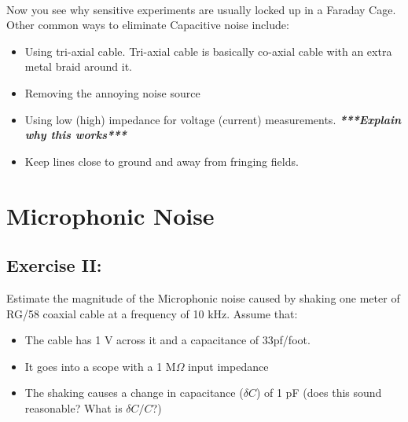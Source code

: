 \documentclass{../lab}
\begin{document}
\\
Now you see why sensitive experiments are usually locked up in a Faraday Cage. Other common ways to eliminate Capacitive noise include:

\begin{itemize}
    \item Using tri-axial cable. Tri-axial cable is basically co-axial cable with an extra metal braid around it.

    \item Removing the annoying noise source

    \item Using low (high) impedance for voltage (current) measurements. \emph{\textbf{***Explain why this works***}}

    \item Keep lines close to ground and away from fringing fields.

\end{itemize}

\section{Microphonic Noise}

\subsection{Exercise II:}

Estimate the magnitude of the Microphonic noise caused by shaking one meter of RG/58 coaxial cable at a frequency of 10 kHz. Assume that:

\begin{itemize}
    \item The cable has 1 V across it and a capacitance of 33pf/foot.

    \item It goes into a scope with a 1 M$\Omega$ input impedance

    \item The shaking causes a change in capacitance ($\delta C$) of 1 pF (does this sound reasonable? What is $\delta C/C$?)

\end{itemize}
\end{document}

